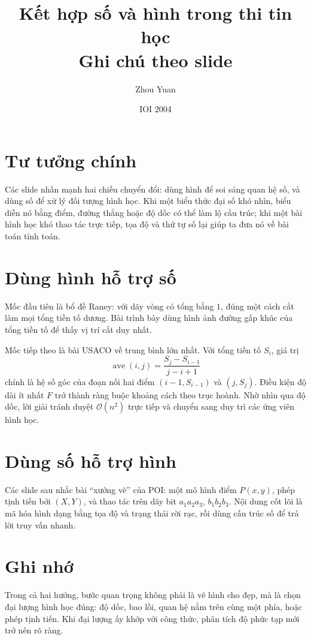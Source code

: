 \documentclass[11pt]{article}
\title{Kết hợp số và hình trong thi tin học\\{\large Ghi chú theo slide}}
\author{Zhou Yuan}
\date{IOI 2004}
\newcommand{\Oh}{\mathcal{O}}
\begin{document}
\maketitle


\section{Tư tưởng chính}

Các slide nhấn mạnh hai chiều chuyển đổi: dùng hình để soi sáng quan hệ số,
và dùng số để xử lý đối tượng hình học. Khi một biểu thức đại số khó nhìn,
biểu diễn nó bằng điểm, đường thẳng hoặc độ dốc có thể làm lộ cấu trúc; khi
một bài hình học khó thao tác trực tiếp, tọa độ và thứ tự số lại giúp ta đưa
nó về bài toán tính toán.

\section{Dùng hình hỗ trợ số}

Mốc đầu tiên là bổ đề Raney: với dãy vòng có tổng bằng \(1\), đúng một cách
cắt làm mọi tổng tiền tố dương. Bài trình bày dùng hình ảnh đường gấp khúc
của tổng tiền tố để thấy vị trí cắt duy nhất.

Mốc tiếp theo là bài USACO về trung bình lớn nhất. Với tổng tiền tố
\(S_i\), giá trị
\[
  \operatorname{ave}(i,j)=\frac{S_j-S_{i-1}}{j-i+1}
\]
chính là hệ số góc của đoạn nối hai điểm
\((i-1,S_{i-1})\) và \((j,S_j)\). Điều kiện độ dài ít nhất \(F\) trở thành
ràng buộc khoảng cách theo trục hoành. Nhờ nhìn qua độ dốc, lời giải tránh
duyệt \(\Oh(n^2)\) trực tiếp và chuyển sang duy trì các ứng viên hình học.

\section{Dùng số hỗ trợ hình}

Các slide sau nhắc bài ``xưởng vẽ'' của POI: một mô hình điểm
\(P(x,y)\), phép tịnh tiến bởi \((X,Y)\), và thao tác trên dãy bit
\(a_1a_2a_3\), \(b_1b_2b_3\). Nội dung cốt lõi là mã hóa hình dạng bằng tọa
độ và trạng thái rời rạc, rồi dùng cấu trúc số để trả lời truy vấn nhanh.

\section{Ghi nhớ}

Trong cả hai hướng, bước quan trọng không phải là vẽ hình cho đẹp, mà là chọn
đại lượng hình học đúng: độ dốc, bao lồi, quan hệ nằm trên cùng một phía,
hoặc phép tịnh tiến. Khi đại lượng ấy khớp với công thức, phân tích độ phức
tạp mới trở nên rõ ràng.
\end{document}
